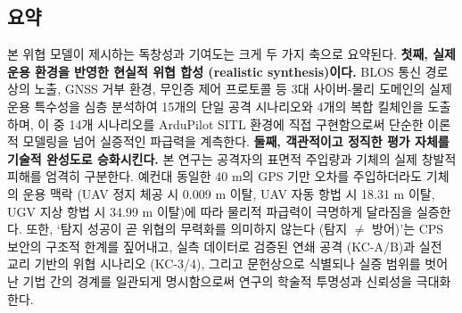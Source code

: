 \subsection{요약}
본 위협 모델이 제시하는 독창성과 기여도는 크게 두 가지 축으로 요약된다.
\textbf{첫째, 실제 운용 환경을 반영한 현실적 위협 합성 (realistic synthesis)이다.} 
BLOS 통신 경로상의 노출, GNSS 거부 환경, 무인증 제어 프로토콜 등 3대 사이버-물리 도메인의 실제 운용 특수성을 심층 분석하여 15개의 단일 공격 시나리오와 4개의 복합 킬체인을 도출하며, 이 중 14개 시나리오를 ArduPilot SITL 환경에 직접 구현함으로써 단순한 이론적 모델링을 넘어 실증적인 파급력을 계측한다.
\textbf{둘째, 객관적이고 정직한 평가 자체를 기술적 완성도로 승화시킨다.} 
본 연구는 공격자의 표면적 주입량과 기체의 실제 창발적 피해를 엄격히 구분한다. 예컨대 동일한 40 m의 GPS 기만 오차를 주입하더라도 기체의 운용 맥락 (UAV 정지 체공 시 0.009 m 이탈, UAV 자동 항법 시 18.31 m 이탈, UGV 지상 항법 시 34.99 m 이탈)에 따라 물리적 파급력이 극명하게 달라짐을 실증한다. 또한, `탐지 성공이 곧 위협의 무력화를 의미하지 않는다 (탐지 $\neq$ 방어)'는 CPS 보안의 구조적 한계를 짚어내고, 실측 데이터로 검증된 연쇄 공격 (KC-A/B)과 실전 교리 기반의 위협 시나리오 (KC-3/4), 그리고 문헌상으로 식별되나 실증 범위를 벗어난 기법 간의 경계를 일관되게 명시함으로써 연구의 학술적 투명성과 신뢰성을 극대화한다.




